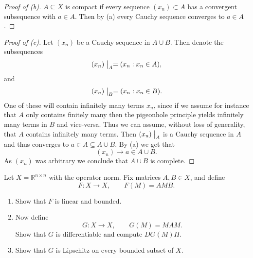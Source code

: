 \begin{proof}[Proof of (b)]
    $A \subseteq X$ is compact if every sequence 
    $(x_n) \subset A$ has a convergent subsequence with 
    $a \in A$. Then 
    by (a) every Cauchy sequence converges to $a \in A$.
\end{proof}

\begin{proof}[Proof of (c)]
    Let $(x_n)$ be a Cauchy sequence in $A \cup B$. 
    Then denote the subsequences 
    \[
        (x_n)\bigm|_A = (x_n : x_n \in A), 
    \]
    and 
    \[
        (x_n)\bigm|_B = (x_n : x_n \in B).
    \]
    One of these will contain infinitely many terms $x_n$, since 
    if we assume for instance that $A$ only contains finitely many 
    then the pigeonhole principle yields infinitely many terms in 
    $B$ and vice-versa. Thus we can assume, without loss of 
    generality, that $A$ contains infinitely many terms. 
    Then $(x_n)\bigm|_A$ is a Cauchy sequence in $A$ and thus 
    converges to $a \in A \subseteq A \cup B$.
    By (a) we get that 
    \[
        (x_n) \to a \in A \cup B.
    \]
    As $(x_n)$ was arbitrary we conclude that $A \cup B$ is 
    complete.
\end{proof}

\begin{prob}[Problem 2]
Let $X=\mathbb R^{n\times n}$ with the operator norm. Fix matrices $A,B\in X$, and define
\[
    F:X\to X,\qquad F(M)=AMB.
\]

\begin{enumerate}[label=\alph*)]
    \item Show that $F$ is linear and bounded.

    \item Now define
    \[
        G:X\to X,\qquad G(M)=MAM.
    \]
    Show that $G$ is differentiable and compute $DG(M)H$.

    \item Show that $G$ is Lipschitz on every bounded subset of $X$.
\end{enumerate}
\end{prob}


